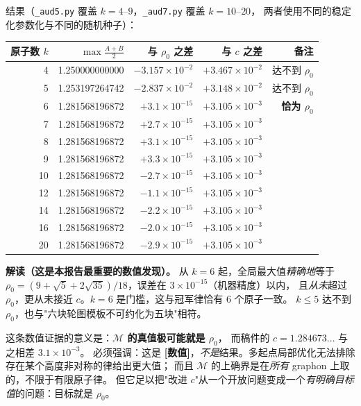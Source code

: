 \documentclass[UTF8,11pt]{ctexart}
\theoremstyle{definition}
\newcommand{\num}{\textcolor[rgb]{0.55,0.35,0.00}{\bfseries [数值]}}
\begin{document}
\noindent 结果（\texttt{\_aud5.py} 覆盖 $k=4$--$9$，\texttt{\_aud7.py} 覆盖 $k=10$--$20$，
两者使用不同的稳定化参数化与不同的随机种子）：
\begin{center}
\small
\begin{tabular}{rrrrr}
\toprule
原子数 $k$ & $\max\frac{A+B}2$ & 与 $\rho_0$ 之差 & 与 $c$ 之差 & 备注\\
\midrule
4  & 1.250000000000 & $-3.157\times10^{-2}$ & $+3.467\times10^{-2}$ & 达不到 $\rho_0$\\
5  & 1.253197264742 & $-2.837\times10^{-2}$ & $+3.148\times10^{-2}$ & 达不到 $\rho_0$\\
6  & 1.281568196872 & $+3.1\times10^{-15}$ & $+3.105\times10^{-3}$ & \textbf{恰为 $\rho_0$}\\
7  & 1.281568196872 & $+2.7\times10^{-15}$ & $+3.105\times10^{-3}$ & \\
8  & 1.281568196872 & $+3.1\times10^{-15}$ & $+3.105\times10^{-3}$ & \\
9  & 1.281568196872 & $+3.3\times10^{-15}$ & $+3.105\times10^{-3}$ & \\
10 & 1.281568196872 & $-2.7\times10^{-15}$ & $+3.105\times10^{-3}$ & \\
12 & 1.281568196872 & $-1.1\times10^{-15}$ & $+3.105\times10^{-3}$ & \\
14 & 1.281568196872 & $-2.2\times10^{-15}$ & $+3.105\times10^{-3}$ & \\
16 & 1.281568196872 & $-2.0\times10^{-15}$ & $+3.105\times10^{-3}$ & \\
20 & 1.281568196872 & $-2.9\times10^{-15}$ & $+3.105\times10^{-3}$ & \\
\bottomrule
\end{tabular}
\end{center}

\noindent\textbf{解读（这是本报告最重要的数值发现）。} 从 $k=6$ 起，全局最大值\emph{精确地}等于
$\rho_0=(9+\sqrt5+2\sqrt{35})/18$，误差在 $3\times10^{-15}$（机器精度）以内，
且\emph{从未}超过 $\rho_0$，更从未接近 $c$。$k=6$ 是门槛，这与冠军律恰有 $6$ 个原子一致。
$k\le5$ 达不到 $\rho_0$，也与"六块轮图模板不可约化为五块"相符。

这条数值证据的意义是：\textbf{$\mathcal M$ 的真值极可能就是 $\rho_0$}，
而稿件的 $c=1.284673\ldots$ 与之相差 $3.1\times10^{-3}$。
必须强调：这是 \num，\emph{不是}结果。多起点局部优化无法排除存在某个高度非对称的律给出更大值；
而且 $\mathcal M$ 的上确界是在\emph{所有} graphon 上取的，不限于有限原子律。
但它足以把"改进 $c$"从一个开放问题变成一个\emph{有明确目标值}的问题：目标就是 $\rho_0$。
\end{document}
